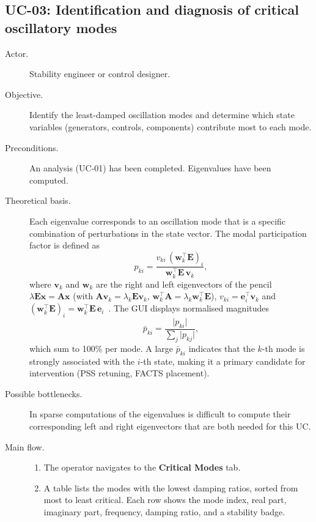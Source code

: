 \subsection{UC-03: Identification and diagnosis of critical oscillatory modes}

\begin{description}
  \item[Actor.] Stability engineer or control designer.
  \item[Objective.] Identify the least-damped oscillation modes and determine which state variables (generators, controls, components) contribute most to each mode.
  \item[Preconditions.] An analysis (UC-01) has been completed. Eigenvalues have been computed.
  \item[Theoretical basis.] Each eigenvalue corresponds to an oscillation mode that is a specific combination of perturbations in the state vector. The modal participation factor is defined as
        \[
          p_{ki}=\frac{v_{ki}\,(\mathbf{w}_k^{\top}\mathbf{E})_i}{\mathbf{w}_k^{\top}\mathbf{E}\,\mathbf{v}_k},
        \]
        where $\mathbf{v}_k$ and $\mathbf{w}_k$ are the right and left eigenvectors of the pencil $\lambda\mathbf{E}\mathbf{x}=\mathbf{A}\mathbf{x}$ (with $\mathbf{A}\mathbf{v}_k=\lambda_k\mathbf{E}\mathbf{v}_k$, $\mathbf{w}_k^{\top}\mathbf{A}=\lambda_k\mathbf{w}_k^{\top}\mathbf{E}$), $v_{ki}=\mathbf{e}_i^{\top}\mathbf{v}_k$ and $(\mathbf{w}_k^{\top}\mathbf{E})_i=\mathbf{w}_k^{\top}\mathbf{E}\,\mathbf{e}_i$~\cite{tzounas2019modal}. The GUI displays normalised magnitudes
        \[
          \bar{p}_{ki}=\frac{\lvert p_{ki}\rvert}{\sum_{j}\lvert p_{kj}\rvert},
        \]
        which sum to 100\% per mode. A large $\bar{p}_{ki}$ indicates that the $k$-th mode is strongly associated with the $i$-th state, making it a primary candidate for intervention (PSS retuning, FACTS placement).
  \item[Possible bottlenecks.] In sparse computations of the eigenvalues is difficult to compute their corresponding left and right eigenvectors that are both needed for this UC.
  \item[Main flow.]
        \begin{enumerate}[before=\leavevmode, leftmargin=*]
          \item The operator navigates to the \textbf{Critical Modes} tab.
          \item A table lists the modes with the lowest damping ratios, sorted from most to least critical. Each row shows the mode index, real part, imaginary part, frequency, damping ratio, and a stability badge.

\end{enumerate}
\end{description}
